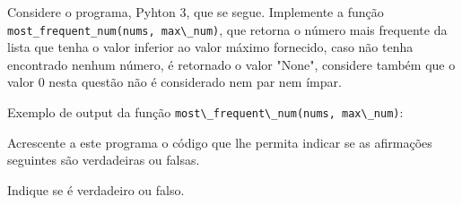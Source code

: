 \documentclass[12pt,varwidth=16cm,border=1pt]{standalone}
\begin{document}
Considere o programa, Pyhton 3, que se segue. Implemente a função \verb+most_frequent_num(nums, max\_num)+, que retorna o número mais frequente da lista que tenha o valor inferior ao valor máximo fornecido, caso não tenha encontrado nenhum número, é retornado o valor "None", considere também que o valor 0 nesta questão não é considerado nem par nem ímpar.



Exemplo de output da função \verb+most\_frequent\_num(nums, max\_num)+:



Acrescente a este programa o código que lhe permita indicar se as
afirmações seguintes são verdadeiras ou falsas.

Indique se é verdadeiro ou falso.
\end{document}
